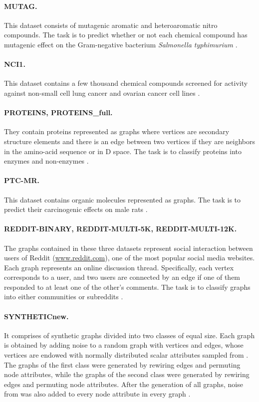 \documentclass[twoside,11pt]{article}
\begin{document}
\paragraph{MUTAG.} This dataset consists of  mutagenic aromatic and heteroaromatic nitro compounds.
The task is to predict whether or not each chemical compound has mutagenic effect on the Gram-negative bacterium {\it Salmonella typhimurium} .
\paragraph{NCI1.} This dataset contains a few thousand chemical compounds screened for activity against non-small cell lung cancer and ovarian cancer cell lines .
\paragraph{PROTEINS, PROTEINS\_full.} They contain proteins represented as graphs where vertices are secondary structure elements and there is an edge between two vertices if they are neighbors in the amino-acid sequence or in D space.
The task is to classify proteins into enzymes and non-enzymes . 
\paragraph{PTC-MR.} This dataset contains  organic molecules represented as graphs.
The task is to predict their carcinogenic effects on male rats . 
\paragraph{REDDIT-BINARY, REDDIT-MULTI-5K, REDDIT-MULTI-12K.} The graphs contained in these three datasets represent social interaction between users of Reddit (\url{www.reddit.com}), one of the most popular social media websites.
Each graph represents an online discussion thread.
Specifically, each vertex corresponds to a user, and two users are connected by an edge if one of them responded to at least one of the other's comments.
The task is to classify graphs into either communities or subreddits .
\paragraph{SYNTHETICnew.} It comprises of  synthetic graphs divided into two classes of equal size.
Each graph is obtained by adding noise to a random graph with  vertices and  edges, whose vertices are endowed with normally distributed scalar attributes sampled from .
The graphs of the first class were generated by rewiring  edges and permuting  node attributes, while the graphs of the second class were generated by rewiring  edges and permuting  node attributes.
After the generation of all graphs, noise from  was also added to every node attribute in every graph .
\end{document}
